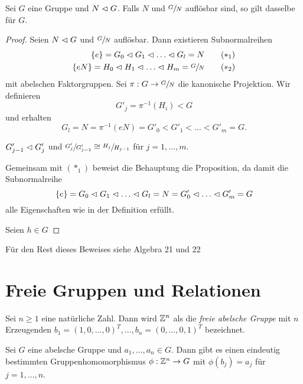 \begin{proposition}
	Sei $G$ eine Gruppe und $N \vartriangleleft G$. Falls $N$ und $\sfrac{G}{N}$ auflösbar sind, so gilt dasselbe für $G$.
\end{proposition}

\begin{proof}
	Seien $N \vartriangleleft G$ und $\sfrac{G}{N}$ auflösbar. Dann existieren Subnormalreihen
	\begin{align*}
		\{e\} = G_0 \lTri G_1 \lTri \ldots \lTri G_{l} = N \tag{$*_{1}$}\\
		\{eN\} = H_0 \lTri H_1 \lTri \ldots \lTri H_{m} = \sfrac{G}{N} \tag{$*_{2}$}
	\end{align*}
	mit abelschen Faktorgruppen. Sei $\pi: G \to \sfrac{G}{N}$ die kanonische Projektion.
	Wir definieren
	\[
		G'_{j} = \pi^{-1}(H_{i}) < G
	\] 
	und erhalten
	\[
		G_{l} = N = \pi^{-1}(e N) = G'_{0} < G'_{1} < \ldots < G'_{m} = G
	.\] 
	\begin{claim}
		$G'_{j-1} \vartriangleleft G'_{j}$ und $\sfrac{G'_{j}}{G'_{j-1}} \cong \sfrac{H_j}{H_{j-1}}$ für $j = 1,\ldots,m$.
	\end{claim}
	Gemeinsam mit $(*_{1})$ beweist die Behauptung die Proposition, da damit die Subnormalreihe
	\[
		\{e\}  = G_{0} \vartriangleleft G_1 \vartriangleleft \ldots \vartriangleleft G_{l} = N = G'_{0} \vartriangleleft \ldots \vartriangleleft G'_{m} = G
	\] 
	alle Eigenschaften wie in der Definition erfüllt.

	Seien $h \in G_{}$
\end{proof}

Für den Rest dieses Beweises siehe Algebra 21 und 22

\section{Freie Gruppen und Relationen}
\begin{definition}
	Sei $n \geq 1$ eine natürliche Zahl. Dann wird $\mathbb{Z}^{n}$ als die \emph{freie abelsche Gruppe} mit $n$ Erzeugenden  
	$b_1 = (1,0,\ldots,0)^{T}, \ldots , b_{n} = (0,\ldots,0,1)^{T}$ bezeichnet.
\end{definition}

\begin{lemma}
	Sei $G$ eine abelsche Gruppe und $a_1,\ldots,a_{n} \in G$. Dann gibt es einen eindeutig bestimmten 
	Gruppenhomomorphismus $\phi: \mathbb{Z}^{n} \to G$ mit $\phi(b_{j}) = a_{j}$ für $j = 1,\ldots,n$.
\end{lemma}

